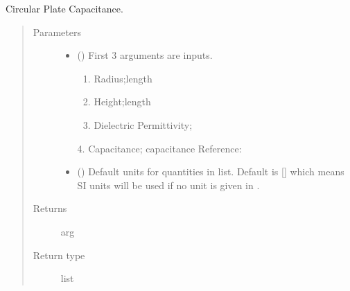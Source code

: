 \documentclass[letterpaper,10pt,english]{sphinxmanual}
\begin{document}

\begin{fulllineitems}
\label{\detokenize{components:components.CircularPlateCap}}
Circular Plate Capacitance.
\begin{quote}\begin{description}
\item[{Parameters}] \leavevmode\begin{itemize}
\item {} 
 () \textendash{} 
First 3 arguments are inputs.
\begin{enumerate}
%
\item {} 
Radius;length

\item {} 
Height;length

\item {} 
Dielectric Permittivity;

\end{enumerate}

4. Capacitance; capacitance
Reference:


\item {} 
 (\sphinxstyleliteralemphasis{\sphinxupquote{, }}) \textendash{} Default units for quantities in  list. Default is {[}{]} which means SI units will be used if no unit is given in .

\end{itemize}

\item[{Returns}] \leavevmode
arg

\item[{Return type}] \leavevmode
list

\end{description}\end{quote}

\end{fulllineitems}
\end{document}
